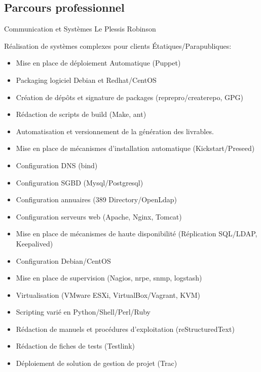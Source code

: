 \documentclass[10pt,a4paper]{moderncv}
\begin{document}
\subsection{Parcours professionnel}

              {Communication et Systèmes}
              {Le Plessis Robinson}
              {}
              {Réalisation de systèmes complexes pour clients Étatiques/Parapubliques:
                \begin{itemize}
                \item Mise en place de déploiement Automatique (Puppet)
                \item Packaging logiciel Debian et Redhat/CentOS
                \item Création de dépôts et signature de packages (reprepro/createrepo, GPG)
                \item Rédaction de scripts de build (Make, ant)
                \item Automatisation et versionnement de la génération des livrables.
                \item Mise en place de mécanismes d'installation automatique (Kickstart/Preseed)
                \item Configuration DNS (bind)
                \item Configuration SGBD (Mysql/Postgresql)
                \item Configuration annuaires (389 Directory/OpenLdap)
                \item Configuration serveurs web (Apache, Nginx, Tomcat)
                \item Mise en place de mécanismes de haute disponibilité (Réplication SQL/LDAP, Keepalived)
                \item Configuration Debian/CentOS
                \item Mise en place de supervision (Nagios, nrpe, snmp, logstash)
                \item Virtualisation (VMware ESXi, VirtualBox/Vagrant, KVM)
                \item Scripting varié en Python/Shell/Perl/Ruby
                \item Rédaction de manuels et procédures d'exploitation (reStructuredText)
                \item Rédaction de fiches de tests (Testlink)
                \item Déploiement de solution de gestion de projet (Trac)
                \end{itemize}
              }
\end{document}
